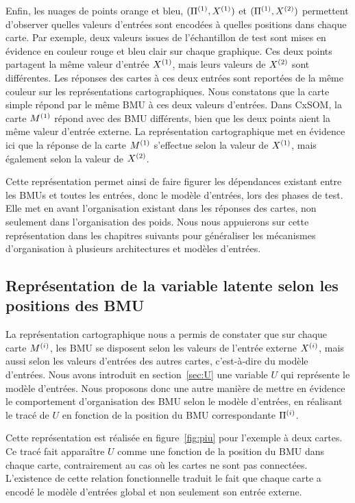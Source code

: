 \documentclass[../main]{subfiles}
\begin{document}
Enfin, les nuages de points orange et bleu, $(\Pi^{({1})},X^{({1})})$ et $(\Pi^{({1})},X^{({2})})$ permettent d'observer quelles valeurs d'entrées sont encodées à quelles positions dans chaque carte.
Par exemple, deux valeurs issues de l'échantillon de test sont mises en évidence en couleur rouge et bleu clair sur chaque graphique.
Ces deux points partagent la même valeur d'entrée $X^{({1})}$, mais leurs valeurs de $X^{({2})}$ sont différentes. Les réponses des cartes à ces deux entrées sont reportées de la même couleur sur les représentations cartographiques. Nous constatons que la carte simple répond par le même BMU à ces deux valeurs d'entrées. Dans CxSOM, la carte $M^{({1})}$ répond avec des BMU différents, bien que les deux points aient la même valeur d'entrée externe. La représentation cartographique met en évidence ici que la réponse de la carte $M^{({1})}$ s'effectue selon la valeur de $X^{({1})}$, mais également selon la valeur de $X^{({2})}$. 

Cette représentation permet ainsi de faire figurer les dépendances existant entre les BMUs et toutes les entrées, donc le modèle d'entrées, lors des phases de test. Elle met en avant l'organisation existant dans les réponses des cartes, non seulement dans l'organisation des poids.
Nous nous appuierons sur cette représentation dans les chapitres suivants pour généraliser les mécanismes d'organisation à plusieurs architectures et modèles d'entrées.

\subsection{Représentation de la variable latente selon les positions des BMU}\label{sec:u_bmu}

La représentation cartographique nous a permis de constater que sur chaque carte $M^{({i})}$, les BMU se disposent selon les valeurs de l'entrée externe $X^{({i})}$, mais aussi selon les valeurs d'entrées des autres cartes, c'est-à-dire du modèle d'entrées.
Nous avons introduit en section~\ref{sec:U} une variable $U$ qui représente le modèle d'entrées. 
Nous proposons donc une autre manière de mettre en évidence le comportement d'organisation des BMU selon le modèle d'entrées, en réalisant le tracé de $U$ en fonction de la position du BMU correspondante $\Pi^{({i})}$.

Cette représentation est réalisée en figure~\ref{fig:piu} pour l'exemple à deux cartes.
Ce tracé fait apparaître $U$ comme une fonction de la position du BMU dans chaque carte, contrairement au cas où les cartes ne sont pas connectées. 
L'existence de cette relation fonctionnelle traduit le fait que chaque carte a encodé le modèle d'entrées global et non seulement son entrée externe.
\end{document}
